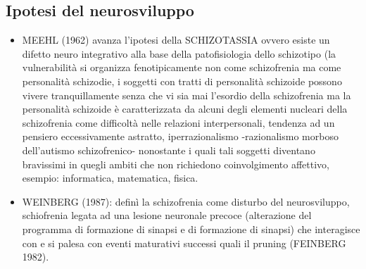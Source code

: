 \subsection{Ipotesi del neurosviluppo}

\begin{itemize}
\item
  MEEHL (1962) avanza l'ipotesi della SCHIZOTASSIA ovvero esiste un
  difetto neuro integrativo alla base della patofisiologia dello
  schizotipo (la vulnerabilità si organizza fenotipicamente non come
  schizofrenia ma come personalità schizodie, i soggetti con tratti di
  personalità schizoide possono vivere tranquillamente senza che vi sia
  mai l'esordio della schizofrenia ma la personalità schizoide è
  caratterizzata da alcuni degli elementi nucleari della schizofrenia
  come difficoltà nelle relazioni interpersonali, tendenza ad un
  pensiero eccessivamente astratto, iperrazionalismo -razionalismo
  morboso dell'autismo schizofrenico- nonostante i quali tali soggetti
  diventano bravissimi in quegli ambiti che non richiedono
  coinvolgimento affettivo, esempio: informatica, matematica, fisica.
\item
  WEINBERG (1987): definì la schizofrenia come disturbo del
  neurosviluppo, schiofrenia legata ad una lesione neuronale precoce
  (alterazione del programma di formazione di sinapsi e di formazione di
  sinapsi) che interagisce con e si palesa con eventi maturativi
  successi quali il pruning (FEINBERG 1982).
\end{itemize}

